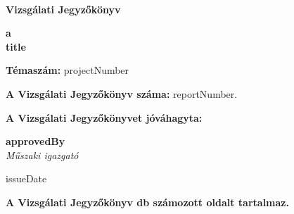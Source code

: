 \documentclass[a4paper,12pt]{article}
\begin{document}
	
	
	\thispagestyle{firstpage}
	
	\begin{flushleft}
		{\footnotesize  
			\textbf{
				 \\
				\vspace{-2mm} 
			}
		}
	\end{flushleft}
	
	\vfill
	
	\begin{center}
		{\Huge \textbf{Vizsgálati Jegyzőkönyv}}
	\end{center}
	
	\vfill
	
	\begin{center}
		\large
		\textbf{a} \\
		\textbf{{{title}}}
	\end{center}
	
	\vfill
	
	\begin{center}
		\textbf{Témaszám:} {{projectNumber}}
	\end{center}    
	
	\vfill
	
	\begin{center}
		\textbf{A Vizsgálati Jegyzőkönyv száma:} {{reportNumber}}.
	\end{center}
	
	\begin{center}
		\textbf{A Vizsgálati Jegyzőkönyvet jóváhagyta:}
	\end{center}    
	
	\vfill
	
	\begin{center}
		\textbf{{{approvedBy}}}\\
		\textit{Műszaki igazgató} \\
	\end{center}    
	
	\vfill
	
	\begin{center}
		{{issueDate}}
	\end{center}    
	
	\vfill
	
	\begin{center}
		\textbf{A Vizsgálati Jegyzőkönyv \pageref{LastPage} db számozott oldalt tartalmaz.}
	\end{center}    
	
\end{document}
